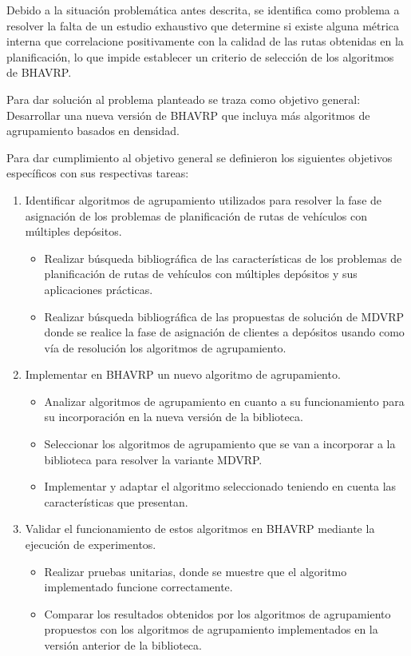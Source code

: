 Debido a la situaci\'on problem\'atica antes descrita, se identifica como problema a resolver la falta de un estudio exhaustivo que determine si existe alguna m\'etrica interna que correlacione positivamente con la calidad de las rutas obtenidas en la planificaci\'on, lo que impide establecer un criterio de selecci\'on de los algoritmos de BHAVRP.

Para dar soluci\'on al problema planteado se traza como objetivo general: Desarrollar una nueva versi\'on de BHAVRP que incluya m\'as algoritmos de agrupamiento basados en densidad.

Para dar cumplimiento al objetivo general se definieron los siguientes objetivos espec\'ificos con sus respectivas tareas:

\begin{enumerate}
  \item Identificar algoritmos de agrupamiento utilizados para resolver la fase de asignaci\'on de los problemas de planificaci\'on de rutas de veh\'iculos con m\'ultiples dep\'ositos.
  \begin{itemize}
    \item Realizar b\'usqueda bibliogr\'afica de las caracter\'isticas de los problemas de planificaci\'on de rutas de veh\'iculos con m\'ultiples dep\'ositos y sus aplicaciones pr\'acticas.
    \item Realizar b\'usqueda bibliogr\'afica de las propuestas de soluci\'on de MDVRP donde se realice la fase de asignaci\'on de clientes a dep\'ositos usando como v\'ia de resoluci\'on los algoritmos de agrupamiento.
  \end{itemize}
  \item Implementar en BHAVRP un nuevo algoritmo de agrupamiento.
  \begin{itemize}
    \item Analizar algoritmos de agrupamiento en cuanto a su funcionamiento para su incorporaci\'on en la nueva versi\'on de la biblioteca.
    \item Seleccionar los algoritmos de agrupamiento que se van a incorporar a la biblioteca para resolver la variante MDVRP.
    \item Implementar y adaptar el algoritmo seleccionado teniendo en cuenta las caracter\'isticas que presentan.
  \end{itemize}
  \item Validar el funcionamiento de estos algoritmos en BHAVRP mediante la ejecuci\'on de experimentos.
  \begin{itemize}
    \item Realizar pruebas unitarias, donde se muestre que el algoritmo implementado funcione correctamente.
    \item Comparar los resultados obtenidos por los algoritmos de agrupamiento propuestos con los algoritmos de agrupamiento implementados en la versi\'on anterior de la biblioteca.
  \end{itemize}
\end{enumerate}


